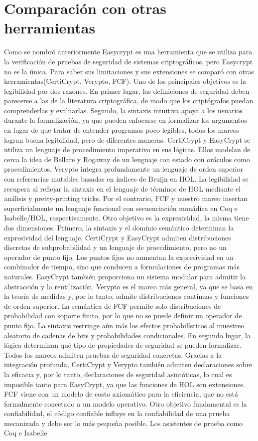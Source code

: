 \documentclass[runningheads]{llncs}
\begin{document}
\section{Comparación con otras herramientas}
Como se nombró anteriormente Easycrypt es una herramienta que se utiliza para la verificación de pruebas de seguridad de sistemas criptográficos, pero Easycrypt no es la única. Para saber sus limitaciones y sus extensiones se comparó con otras herramientas(CertiCrypt, Verypto, FCF). Uno de los principales objetivos es la legibilidad por dos razones. En primer lugar, las definiciones de seguridad deben parecerse a las de la literatura criptográfica, de modo que los criptógrafos puedan comprenderlas y evaluarlas. Segundo, la sintaxis intuitiva apoya a los usuarios durante la formalización, ya que pueden enfocarse en formalizar los argumentos en lugar de que tratar de entender programas poco legibles, todos los marcos logran buena legibilidad, pero de diferentes maneras. CertiCrypt y EasyCrypt se utiliza un lenguaje de procedimiento imperativo en sus lógicas. Ellos modelan de cerca la idea de Bellare y Rogaway de un lenguaje con estado con oráculos como procedimientos\cite{ref_article2}. Verypto integra profundamente un lenguaje de orden superior con referencias mutables basadas en índices de Bruijn en HOL\cite{ref_article3}. La legibilidad se recupera al reflejar la sintaxis en el lenguaje de términos de HOL mediante el análisis y pretty-printing tricks. Por el contrario, FCF y nuestro marco insertan superficialmente un lenguaje funcional con secuenciación monádica en Coq e Isabelle/HOL, respectivamente\cite{ref_article4}. Otro objetivo es la expresividad, la misma tiene dos dimensiones. Primero, la sintaxis y el dominio semántico determinan la expresividad del lenguaje, CertiCrypt y EasyCrypt admiten distribuciones discretas de subprobabilidad y un lenguaje de procedimiento, pero no un operador de punto fijo. Los puntos fijos no aumentan la expresividad en un combinador de tiempo, sino que conducen a formulaciones de programas más naturales. EasyCrypt también proporciona un sistema modular para admitir la abstracción y la reutilización. Verypto es el marco más general, ya que se basa en la teoría de medidas y, por lo tanto, admite distribuciones continuas y funciones de orden superior. La semántica de FCF permite solo distribuciones de probabilidad con soporte finito, por lo que no se puede definir un operador de punto fijo. La sintaxis restringe aún más los efectos probabilísticos al muestreo aleatorio de cadenas de bits y probabilidades condicionales. En segundo lugar, la lógica determinan qué tipo de propiedades de seguridad se pueden formalizar. Todos los marcos admiten pruebas de seguridad concretas. Gracias a la integración profunda, CertiCrypt y Verypto también admiten declaraciones sobre la eficacia y, por lo tanto, declaraciones de seguridad asintóticas, lo cual es imposible tanto para EasyCrypt, ya que las funciones de HOL son extensiones. FCF viene con un modelo de costo axiomático para la eficiencia, que no está formalmente conectado a un modelo operativo. Otro objetivo fundamental es la confiabilidad, el código confiable influye en la confiabilidad de una prueba mecanizada y debe ser lo más pequeña posible. Los asistentes de prueba como Coq e Isabelle 
\end{document}
